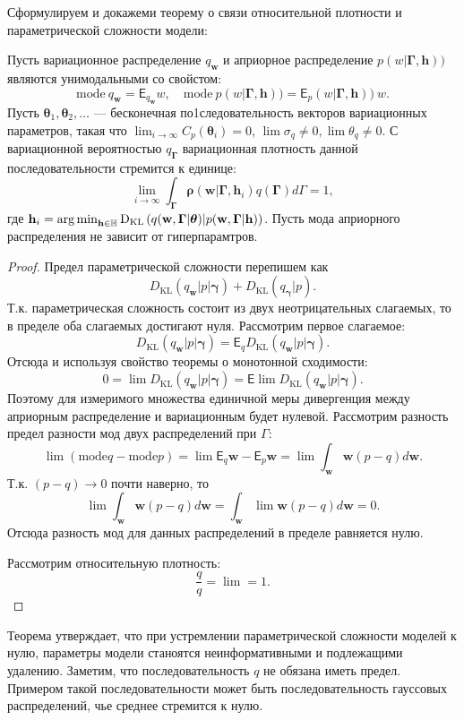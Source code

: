 Сформулируем и докажеми теорему о связи относительной плотности и параметрической сложности модели:
\begin{theorem}
Пусть вариационное распределение $q_\mathbf{w}$ и априорное распределение $p({w}|\boldsymbol{\Gamma}, \mathbf{h}))$ являются унимодальными со свойстом:
\[
    \text{mode}~q_\mathbf{w} = \mathsf{E}_{q_\mathbf{w}}w,\quad \text{mode}~p({w}|\boldsymbol{\Gamma}, \mathbf{h})) = \mathsf{E}_p({w}|\boldsymbol{\Gamma}, \mathbf{h}))~w.
\]
Пусть $\boldsymbol{\theta}_1,\boldsymbol{\theta}_2,\dots$ --- бесконечная по1следовательность векторов вариационных параметров, такая что $\lim_{i \to \infty}C_p(\boldsymbol{\theta}_i) = 0$, $\lim \sigma_q  \neq 0, \lim \theta_q \neq 0.$ 
С вариационной вероятностью $q_{\boldsymbol{\Gamma}}$ вариационная плотность данной последовательности стремится к единице:
\[
    \lim_{i \to \infty} \int_{\boldsymbol{\Gamma}} \boldsymbol{\rho}(\mathbf{w}|\boldsymbol{\Gamma}, \mathbf{h}_i)q(\boldsymbol{\Gamma})d\Gamma = 1, 
\]
где $\mathbf{h}_i = \operatorname*{arg\,min}_{\mathbf{h} \in \mathbb{H}} \text{D}_\text{KL}\left(q(\mathbf{w}, \boldsymbol{\Gamma}|\boldsymbol{\theta})|p(\mathbf{w}, \boldsymbol{\Gamma}|\mathbf{h})\right)$. Пусть мода априорного распределения не зависит от гиперпарамтров.
\end{theorem}
\begin{proof}
Предел параметрической сложности перепишем как 
\[
    D_\text{KL}(q_\mathbf{w}|p|\boldsymbol{\gamma}) + D_\text{KL}(q_{\boldsymbol{\gamma}}|p).
\]
Т.к. параметрическая сложность состоит из двух неотрицательных слагаемых, то в пределе оба слагаемых достигают нуля.
Рассмотрим первое слагаемое:
\[
    D_\text{KL}(q_\mathbf{w}|p|\boldsymbol{\gamma}) = \mathsf{E}_q D_\text{KL}(q_\mathbf{w}|p|\boldsymbol{\gamma}).
\]
Отсюда и используя свойство теоремы о монотонной сходимости:
\[
    0 = \lim D_\text{KL}(q_\mathbf{w}|p|\boldsymbol{\gamma}) = \mathsf{E} \lim D_\text{KL}(q_\mathbf{w}|p|\boldsymbol{\gamma}).
\]
Поэтому для измеримого множества единичной меры дивергенция между априорным распределение и вариационным будет нулевой.
Рассмотрим разность предел разности мод двух распределений при $\Gamma$:
\[
    \lim (\text{mode} q -  \text{mode} p) = \lim \mathsf{E}_q \mathbf{w} - \mathsf{E}_p \mathbf{w} = \lim \int_\mathbf{w} \mathbf{w} (p-q) d\mathbf{w}.
\]
Т.к. $(p-q) \to 0$ почти наверно, то  %
\[
    \lim \int_\mathbf{w} \mathbf{w} (p-q) d\mathbf{w} =  \int_\mathbf{w} \lim \mathbf{w} (p-q) d\mathbf{w} = 0.
\]
Отсюда разность мод для данных распределений в пределе равняется нулю.

Рассмотрим относительную плотность:
\[
    \frac{q}{q} = \lim = 1.
\]

\end{proof}
Теорема утверждает, что при устремлении параметрической сложности моделей к нулю, параметры модели станоятся неинформативными и подлежащими удалению. Заметим, что последовательность $q$ не обязана иметь предел. Примером такой последовательности может быть последовательность гауссовых распределений, чье среднее стремится к нулю.

